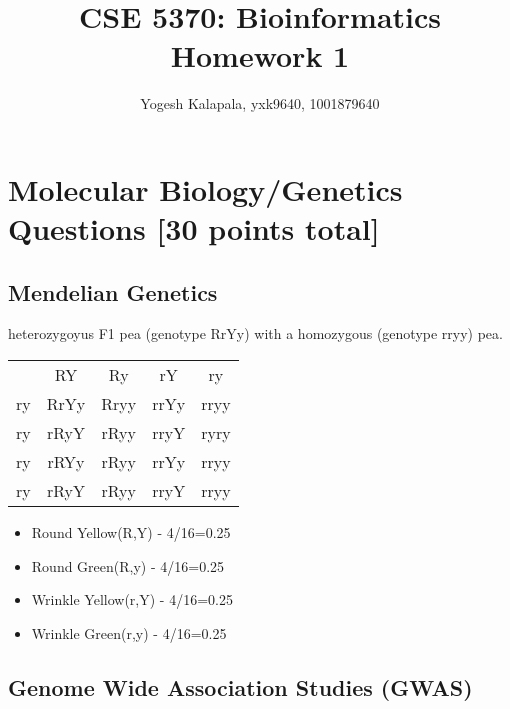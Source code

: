 \documentclass{article}
\title{CSE 5370: Bioinformatics \\ Homework 1}
\author{Yogesh Kalapala, yxk9640, 1001879640}
\date{}
\begin{document}
\maketitle

\section{Molecular Biology/Genetics Questions [30 points total]}
\subsection{Mendelian Genetics}
 heterozygoyus F1 pea (genotype RrYy) with a homozygous (genotype rryy) pea. 

\def\mca#1{\multicolumn{1}{c}{#1}}
\def\mcb#1{\multicolumn{1}{c|}{#1}}
\renewcommand{\arraystretch}{2.25}
\begin{tabular}{c|c|c|c|c|}
  \mca{}  & \mca{RY} & \mca{Ry} & \mca{rY} &\mca{ry} \\\cline{2-5}
  \mcb{ry}   & RrYy    &  Rryy  &rrYy & rryy \\\cline{2-5}
  \mcb{ry}   & rRyY    & rRyy   & rryY  & ryry \\\cline{2-5}
  \mcb{ry} &   rRYy  & rRyy   & rrYy & rryy\\\cline{2-5}
  \mcb{ry} & rRyY    &  rRyy  & rryY & rryy\\\cline{2-5}
\end{tabular}

\begin{itemize}
    \item Round Yellow(R,Y) - 4/16=0.25
    \item Round Green(R,y) - 4/16=0.25 
    \item Wrinkle Yellow(r,Y) - 4/16=0.25 
    \item Wrinkle Green(r,y) - 4/16=0.25 
    
\end{itemize}

\subsection{Genome Wide Association Studies (GWAS)}
\end{document}
